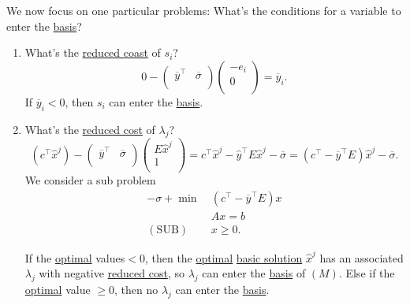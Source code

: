 \begin{prev}
	We now focus on one particular problems: What's the conditions for a variable to enter the \hyperref[def:basic]{basis}?
	\begin{enumerate}
		\item What's the \hyperref[def:reduced-cost]{reduced coast} of \(s_{i}\)?
		      \[
			      0 - \begin{pmatrix}
				      \overline{y}^{\top} & \overline{\sigma} \\
			      \end{pmatrix}\begin{pmatrix}
				      -e_{i} \\
				      0      \\
			      \end{pmatrix} = \overline{y}_i.
		      \]
		      If \(\overline{y}_i<0\), then \(s_{i}\) can enter the \hyperref[def:basic]{basis}.
		\item What's the \hyperref[def:reduced-cost]{reduced cost} of \(\lambda_{j}\)?
		      \[
			      (c^{\top}\hat{x}^j) - \begin{pmatrix}
				      \overline{y}^{\top} & \overline{\sigma} \\
			      \end{pmatrix}\begin{pmatrix}
				      E\hat{x}^j \\
				      1          \\
			      \end{pmatrix} = c^{\top}\hat{x}^j - \hat{y}^{\top}E\hat{x}^j - \overline{\sigma} = (c^{\top} - \overline{y}^{\top}E)\hat{x}^j - \overline{\sigma}.
		      \]
		      We consider a sub problem
		      \[
			      \begin{aligned}
				      -\sigma + \min~     & (c^{\top} - \overline{y}^{\top}E)x \\
				                          & Ax = b                             \\
				      (\mathrm{SUB})\quad & x\geq 0.
			      \end{aligned}
		      \]

		      If the \hyperref[def:optimal-solution]{optimal} values\(<0\), then the \hyperref[def:optimal-solution]{optimal} \hyperref[def:basic-solution]{basic solution}
		      \(\hat{x}^j\) has an associated \(\lambda_{j}\) with negative \hyperref[def:reduced-cost]{reduced cost}, so \(\lambda_{j}\) can
		      enter the \hyperref[def:basic]{basis} of \((M)\). Else if the \hyperref[def:optimal-solution]{optimal} value \(\geq 0\), then no \(\lambda_{j}\) can enter the
		      \hyperref[def:basic]{basis}.


\end{enumerate}
\end{prev}
